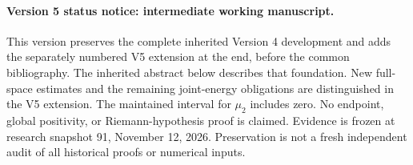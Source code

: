 \documentclass[11pt,a4paper]{article}
\numberwithin{equation}{section}
\theoremstyle{definition}\newtheorem{definition}[theorem]{Definition}
\theoremstyle{remark}\newtheorem{remark}[theorem]{Remark}
\begin{document}
\paragraph{Version 5 status notice: intermediate working manuscript.}
This version preserves the complete inherited Version 4 development and adds the separately numbered V5 extension at the end, before the common bibliography. The inherited abstract below describes that foundation. New full-space estimates and the remaining joint-energy obligations are distinguished in the V5 extension. The maintained interval for $\mu_2$ includes zero. No endpoint, global positivity, or Riemann-hypothesis proof is claimed. Evidence is frozen at research snapshot 91, November 12, 2026. Preservation is not a fresh independent audit of all historical proofs or numerical inputs.
\medskip
\end{document}
